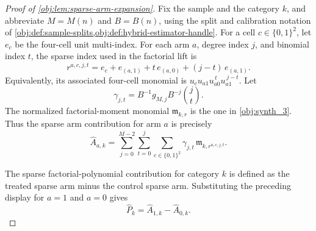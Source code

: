 \begin{proof}[Proof of \cref{obj:lem:sparse-arm-expansion}]
Fix the sample and the category \(k\), and abbreviate \(M=M(n)\) and \(B=B(n)\), using the split and calibration notation of \cref{obj:def:sample-splits,obj:def:hybrid-estimator-handle}.  For a cell \(c\in\{0,1\}^2\), let \(e_c\) be the four-cell unit multi-index.  For each arm \(a\), degree index \(j\), and binomial index \(t\), the sparse index used in the factorial lift is
\[
r^{a,c,j,t}
=
e_c+e_{(a,1)}+t\,e_{(a,0)}+(j-t)\,e_{(a,1)}.
\]
Equivalently, its associated four-cell monomial is \(u_cu_{a1}u_{a0}^{\,t}u_{a1}^{\,j-t}\).  Let
\[
\gamma_{j,t}
=
B^{-1}g_{M,j}B^{-j}\binom jt .
\]
The normalized factorial-moment monomial \(\mathfrak m_{k,r}\) is the one in \cref{obj:synth_3}.  Thus the sparse arm contribution for arm \(a\) is precisely
\[
\widehat A_{a,k}
=
\sum_{j=0}^{M-2}\sum_{t=0}^{j}\sum_{c\in\{0,1\}^2}
\gamma_{j,t}\,
\mathfrak m_{k,r^{a,c,j,t}} .
\]

The sparse factorial-polynomial contribution for category \(k\) is defined as the treated sparse arm minus the control sparse arm.  Substituting the preceding display for \(a=1\) and \(a=0\) gives
\[
\widehat P_k
=
\widehat A_{1,k}-\widehat A_{0,k}.
\]
\end{proof}
